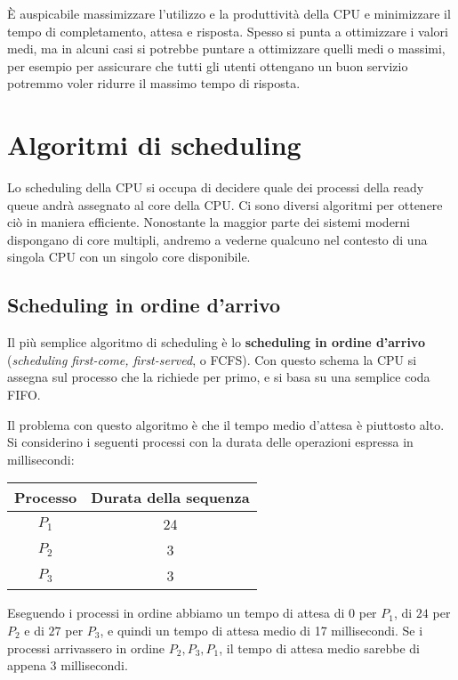     È auspicabile massimizzare l'utilizzo e la produttività della CPU e minimizzare il tempo di completamento, attesa e risposta. Spesso si punta a ottimizzare i valori medi, ma in alcuni casi si potrebbe puntare a ottimizzare quelli medi o massimi, per esempio per assicurare che tutti gli utenti ottengano un buon servizio potremmo voler ridurre il massimo tempo di risposta.
    
\section{Algoritmi di scheduling}
    Lo scheduling della CPU si occupa di decidere quale dei processi della ready queue andrà assegnato al core della CPU. Ci sono diversi algoritmi per ottenere ciò in maniera efficiente. Nonostante la maggior parte dei sistemi moderni dispongano di core multipli, andremo a vederne qualcuno nel contesto di una singola CPU con un singolo core disponibile.
    
    \subsection{Scheduling in ordine d'arrivo}
        Il più semplice algoritmo di scheduling è lo \textbf{scheduling in ordine d'arrivo} (\textit{scheduling first-come, first-served}, o FCFS). Con questo schema la CPU si assegna sul processo che la richiede per primo, e si basa su una semplice coda FIFO.
        
        Il problema con questo algoritmo è che il tempo medio d'attesa è piuttosto alto. Si considerino i seguenti processi con la durata delle operazioni espressa in millisecondi:
        
        \begin{table*}[h]
            \centering
            \begin{tabular}{c c}
                \textbf{Processo} & \textbf{Durata della sequenza} \\ \hline
                $P_1$ & 24\\
                $P_2$ & 3\\
                $P_3$ & 3\\
                \hline
            \end{tabular}
            \label{tab:my_label}
        \end{table*}
        
        Eseguendo i processi in ordine abbiamo un tempo di attesa di $0$ per $P_1$, di $24$ per $P_2$ e di $27$ per $P_3$, e quindi un tempo di attesa medio di 17 millisecondi. Se i processi arrivassero in ordine $P_2, P_3, P_1$, il tempo di attesa medio sarebbe di appena 3 millisecondi.
        
